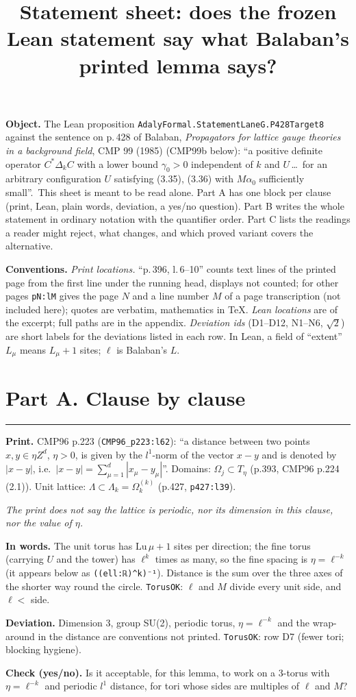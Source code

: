 \documentclass[10pt,a4paper]{article}
\title{\vspace{-8mm}\sffamily\large Statement sheet: does the frozen Lean statement say what Bala\-ban's printed lemma says?}
\date{}\author{}
\newcommand{\lean}[1]{\begingroup\setlength{\topsep}{1pt}\setlength{\partopsep}{0pt}\par\VerbatimInput[fontsize=\fontsize{6}{6.7}\selectfont,frame=lines,framesep=0.6mm,label={\sffamily\fontsize{5.5}{6}\selectfont\csname rng-#1\endcsname},labelposition=topline,rulecolor=\color{gray!55}]{excerpts/#1.txt}\endgroup}
\newcommand{\prt}[2]{\par{\sffamily\scriptsize\textbf{Print.} #1}\par{\small\itshape #2}\par}
\newcommand{\tr}[1]{\par{\sffamily\scriptsize\textbf{In words.}} #1}
\newcommand{\dev}[1]{\par{\sffamily\scriptsize\textbf{Deviation.}} #1}
\newcommand{\chk}[1]{\par{\sffamily\scriptsize\textbf{Check (yes/no).}} #1}
\newcommand{\clause}[1]{\vspace{4pt}\par\noindent{\sffamily\bfseries\color{blue!40!black}#1}\par\nopagebreak\hrule\vspace{1pt}}
\newcommand{\Lu}{\mathrm{Lu}}
\begin{document}
\maketitle\vspace{-12mm}
\fontsize{8.6}{10.2}\selectfont
\textbf{Object.} The Lean proposition \texttt{AdalyFormal.StatementLaneG.P428Target8} against the sentence on p.\,428 of Bala\-ban, \emph{Propagators for lattice gauge theories in a background field}, CMP 99 (1985) (CMP99b below): ``a positive definite operator $C^*\Delta_kC$ with a lower bound $\gamma_0>0$ independent of $k$ and $U$\,\dots\ for an arbitrary configuration $U$ satisfying (3.35), (3.36) with $M\alpha_0$ sufficiently small''.\ This sheet is meant to be read alone. Part A has one block per clause (print, Lean, plain words, deviation, a yes/no question). Part B writes the whole statement in ordinary notation with the quantifier order. Part C lists the readings a reader might reject, what changes, and which proved variant covers the alternative.

\textbf{Conventions.} \emph{Print locations.} ``p.\,396, l.\,6--10'' counts text lines of the printed page from the first line under the running head, displays not counted; for other pages \texttt{pN:lM} gives the page $N$ and a line number $M$ of a page transcription (not included here); quotes are verbatim, mathematics in \TeX. \emph{Lean locations} are of the excerpt; full paths are in the appendix. \emph{Deviation ids} (D1--D12, N1--N6, $\surd2$) are short labels for the deviations listed in each row. In Lean, a field of ``extent'' $L_\mu$ means $L_\mu+1$ sites; $\ell$ is Bala\-ban's $L$.

\section*{Part A. Clause by clause}

\clause{A1\quad Lattice, torus, scale, distance}
\prt{CMP96 p.223 (\texttt{CMP96\_p223:l62}): ``a distance between two points $x,y\in\eta Z^d$, $\eta>0$, is given by the $l^1$-norm of the vector $x-y$ and is denoted by $|x-y|$, i.e.\ $|x-y|=\sum_{\mu=1}^d|x_\mu-y_\mu|$''. Domains: $\Omega_j\subset T_\eta$ (p.393, CMP96 p.224 (2.1)). Unit lattice: $\Lambda\subset\Lambda_k=\Omega_k^{(k)}$ (p.427, \texttt{p427:l39}).}{The print does not say the lattice is periodic, nor its dimension in this clause, nor the value of $\eta$.}
\lean{gA1}
\tr{The unit torus has $\Lu\,\mu+1$ sites per direction; the fine torus (carrying $U$ and the tower) has $\ell^k$ times as many, so the fine spacing is $\eta=\ell^{-k}$ (it appears below as \texttt{((ell:ℝ)\^{}k)⁻¹}). Distance is the sum over the three axes of the shorter way round the circle. \texttt{TorusOK}: $\ell$ and $M$ divide every unit side, and $\ell<$ side.}
\dev{Dimension 3, group SU(2), periodic torus, $\eta=\ell^{-k}$ and the wrap-around in the distance are conventions not printed. \texttt{TorusOK}: row D7 (fewer tori; blocking hygiene).}
\chk{Is it acceptable, for this lemma, to work on a 3-torus with $\eta=\ell^{-k}$ and periodic $l^1$ distance, for tori whose sides are multiples of $\ell$ and $M$?}
\end{document}
